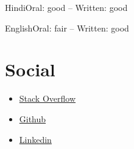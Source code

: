 \begin{factlist}
\item{Hindi}{Oral: good -- Written: good}
\item{English}{Oral: fair -- Written: good}
\end{factlist}

\section{Social}
\begin{itemize}
\item \href{https://stackoverflow.com/users/4373992/jha-g}{Stack Overflow}
\item \href{https://github.com/jha-g}{Github}
\item \href{https://www.linkedin.com/in/gautam0217}{Linkedin}
\end{itemize}


